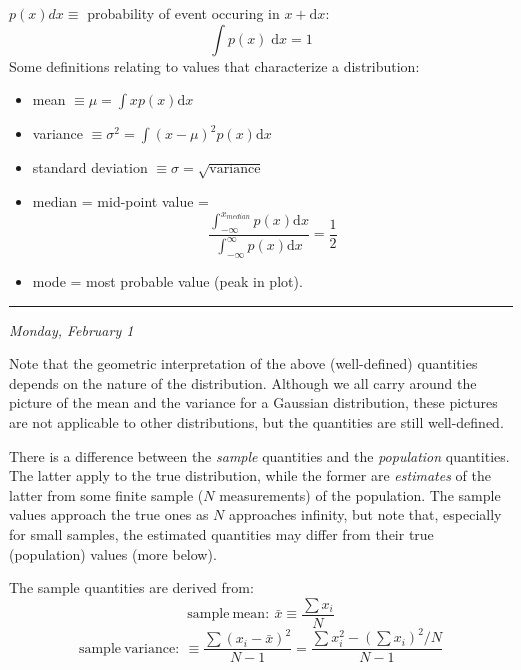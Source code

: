 \documentclass[12pt]{article}
\newcommand{\mydate}[1]{
    \begin{flushright}
        \rule{\textwidth}{0.4pt} %
        \footnotesize\hfill\textit{#1}
    \end{flushright}}
\begin{document}
$p(x)dx \equiv$ probability of event occuring in $x + \mathrm{d}x$:
\[
    \int{ p(x) \;\mathrm{d}x } = 1
    \]
Some definitions relating to values that characterize a distribution:
\begin{itemize}
    \item mean $ \equiv \mu = \int xp(x)\mathrm{d}x $
    \item variance $ \equiv \sigma^{2} = \int (x-\mu)^{2} p(x)\mathrm{d}x $
    \item standard deviation $\equiv \sigma = \sqrt{\mathrm{variance}} $
    \item median = mid-point value =
        \[
            \frac{ \int_{-\infty}^{x_{median}} p(x)\mathrm{d}x }
              { \int_{-\infty}^{\infty} p(x)\mathrm{d}x }
              = \frac{1}{2}
              \]
    \item mode = most probable value (peak in plot).
\end{itemize}

\mydate{Monday, February 1}

Note that the geometric interpretation of the above (well-defined) quantities
depends on the nature of the distribution. Although we all carry around the
picture of the mean and the variance for a Gaussian distribution, these
pictures are not applicable to other distributions, but the quantities are
still well-defined.

There is a difference between the \emph{sample} quantities and the
\emph{population} quantities. The latter apply to the true distribution, while
the former are \emph{estimates} of the latter from some finite sample ($N$
measurements) of the population. The sample values approach the true ones as
$N$ approaches infinity, but note that, especially for small samples, the
estimated quantities may differ from their true (population) values (more
below).

The sample quantities are derived from:
\[
    \mathrm{sample\ mean:\ } \bar{x} \equiv \frac{\sum x_i}{N}
    \]
\[
    \mathrm{sample\ variance:\ } \equiv
    \frac{\sum (x_i-\bar{x})^{2}}{N-1} =
    \frac{\sum x_i^{2}-(\sum x_i)^{2}/N}{N-1}
    \]
\end{document}
